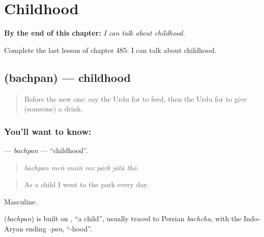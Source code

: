 
\chapter{Childhood}
\label{ch:ur-childhood}

\begin{chapteropening}
\textbf{By the end of this chapter:} \emph{I can talk about childhood.}

Complete the last lesson of chapter 485: I can talk about childhood.
\end{chapteropening}

\section[\texorpdfstring{\ur{بچپن} (bachpan)}{بچپن (bachpan)}]{ (bachpan) — childhood}

\label{lesson:UR-C485-bachpan}



\begin{quote}
Before the new one: say the Urdu for to feed, then the Urdu for to give (someone) a drink.
\end{quote}

\subsection*{You'll want to know: }
\textbf{} — \emph{bachpan} — \textquotedblleft{}childhood\textquotedblright{}.

\begin{quote}
      
\end{quote}

\begin{quote}
\emph{bachpan meṅ maiṅ roz pārk jātā thā.}
\end{quote}

\begin{quote}
As a child I went to the park every day.
\end{quote}

Masculine.

\begin{cousinweb}
\textbf{} (\emph{bachpan}) is built on \textbf{}, \textquotedblleft{}a child\textquotedblright{}, usually traced to Persian \emph{bachcha}, with the Indo-Aryan ending \emph{-pan}, \textquotedblleft{}-hood\textquotedblright{}.
\end{cousinweb}


